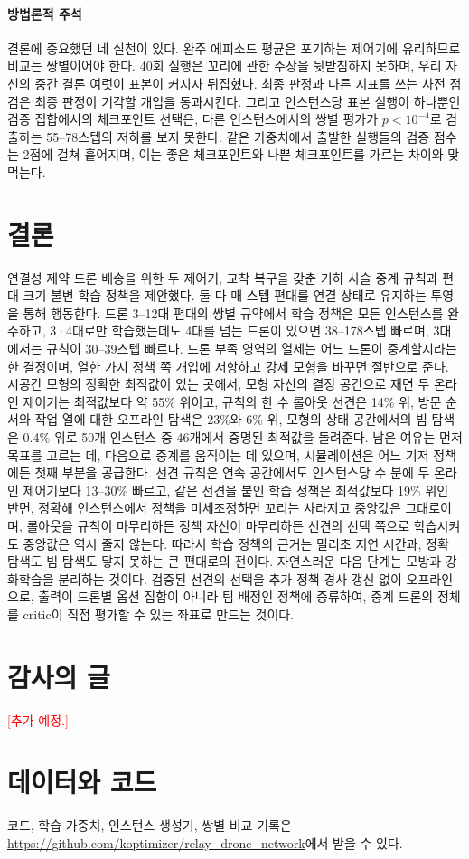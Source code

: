 \documentclass[final,5p,times,twocolumn]{elsarticle}
\newcommand{\pending}[1]{\textcolor{red}{[#1]}}
\begin{document}
\paragraph{방법론적 주석}
결론에 중요했던 네 실천이 있다. 완주 에피소드 평균은 포기하는 제어기에 유리하므로 비교는 쌍별이어야
한다. 40회 실행은 꼬리에 관한 주장을 뒷받침하지 못하며, 우리 자신의 중간 결론 여럿이 표본이 커지자
뒤집혔다. 최종 판정과 다른 지표를 쓰는 사전 점검은 최종 판정이 기각할 개입을 통과시킨다. 그리고
인스턴스당 표본 실행이 하나뿐인 검증 집합에서의 체크포인트 선택은, 다른 인스턴스에서의 쌍별 평가가
$p < 10^{-4}$로 검출하는 55--78스텝의 저하를 보지 못한다. 같은 가중치에서 출발한 실행들의 검증
점수는 2점에 걸쳐 흩어지며, 이는 좋은 체크포인트와 나쁜 체크포인트를 가르는 차이와 맞먹는다.

\section{결론}
\label{sec:conclusion}

연결성 제약 드론 배송을 위한 두 제어기, 교착 복구을 갖춘 기하 사슬 중계 규칙과 편대 크기 불변
학습 정책을 제안했다. 둘 다 매 스텝 편대를 연결 상태로 유지하는 투영을 통해 행동한다. 드론 3--12대
편대의 쌍별 규약에서 학습 정책은 모든 인스턴스를 완주하고, 3·4대로만 학습했는데도 4대를 넘는
드론이 있으면 38--178스텝 빠르며, 3대에서는 규칙이 30--39스텝 빠르다. 드론 부족 영역의 열세는 어느 드론이 중계할지라는
한 결정이며, 열한 가지 정책 쪽 개입에 저항하고 강제 모형을 바꾸면 절반으로 준다. 시공간 모형의 정확한
최적값이 있는 곳에서, 모형 자신의 결정 공간으로 재면 두 온라인 제어기는 최적값보다 약 55\% 위이고,
규칙의 한 수 롤아웃 선견은 14\% 위, 방문 순서와 작업 열에 대한 오프라인 탐색은 23\%와 6\% 위,
모형의 상태 공간에서의 빔 탐색은 0.4\% 위로 50개 인스턴스 중 46개에서 증명된 최적값을 돌려준다.
남은 여유는 먼저 목표를 고르는 데, 다음으로 중계를 움직이는 데 있으며, 시뮬레이션은 어느 기저
정책에든 첫째 부분을 공급한다. 선견 규칙은 연속 공간에서도 인스턴스당 수 분에 두 온라인 제어기보다
13--30\% 빠르고, 같은 선견을 붙인 학습 정책은 최적값보다 19\% 위인 반면, 정확해 인스턴스에서 정책을
미세조정하면 꼬리는 사라지고 중앙값은 그대로이며, 롤아웃을 규칙이 마무리하든 정책 자신이
마무리하든 선견의 선택 쪽으로 학습시켜도 중앙값은 역시 줄지 않는다. 따라서 학습 정책의 근거는
밀리초 지연 시간과, 정확 탐색도 빔 탐색도 닿지 못하는 큰 편대로의 전이다. 자연스러운 다음 단계는
모방과 강화학습을 분리하는 것이다. 검증된 선견의 선택을 추가 정책 경사 갱신 없이 오프라인으로,
출력이 드론별 옵션 집합이 아니라 팀 배정인 정책에 증류하여, 중계 드론의 정체를 critic이 직접 평가할
수 있는 좌표로 만드는 것이다.

\section*{감사의 글}
\pending{추가 예정.}

\section*{데이터와 코드}
코드, 학습 가중치, 인스턴스 생성기, 쌍별 비교 기록은
\url{https://github.com/koptimizer/relay_drone_network}에서 받을 수 있다.



\end{document}
